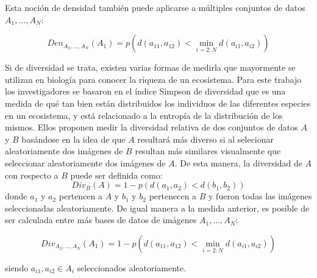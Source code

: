 Esta noción de densidad también puede aplicarse a múltiples conjuntos de datos \({A_{1}, \ldots, A_{N}}\):

\begin{equation}
{Den}_{A_{2}, \ldots, A_{N}}\left(A_{1}\right)=p\left(d\left(a_{11}, a_{12}\right)<\min _{i=2: N} d\left(a_{i 1}, a_{i 2}\right)\right)
\end{equation}

 Si de diversidad se trata, existen varias formas de medirla que mayormente se utilizan en biología para conocer la riqueza de un ecosistema. Para este trabajo los investigadores se basaron en el índice Simpson de diversidad que es una medida de qué tan bien están distribuidos los individuos de las diferentes especies en un ecosistema, y está relacionado a la entropía de la distribución de los mismos. Ellos proponen medir la diversidad relativa de dos conjuntos de datos \(A\) y \(B\) basándose en la idea de que \(A\) resultará más diverso si al selecionar aleatoriamente dos imágenes de \(B\) resultan más similares visualmente que seleccionar aleatoriamente dos imágenes de \(A\). De esta manera, la diversidad de \(A\) con respecto a \(B\) puede ser definida como:
 \begin{equation}
 {Div}_{B}(A)=1-p\left(d\left(a_{1}, a_{2}\right)<d\left(b_{1}, b_{2}\right)\right)
 \end{equation}
  donde \(a_{1}\) y \(a_{2}\) pertencen a \(A\) y  \(b_{1}\) y \(b_{2}\) pertenecen a \(B\) y fueron todas las imágenes seleccionadas aleatoriamente. De igual manera a la medida anterior, es posible de ser calculada entre más bases de datos de imágenes \({A_{1}, \ldots, A_{N}}\):
  
  \begin{equation}
  {Div}_{A_{2}, \ldots, A_{N}}\left(A_{1}\right)=1-p\left(d\left(a_{11}, a_{12}\right)<\min _{i=2: N} d\left(a_{i 1}, a_{i 2}\right)\right)
  \end{equation}
  
  siendo \(a_{i 1}, a_{i 2} \in A_{i}\) seleccionados aleatoriamente.
  
